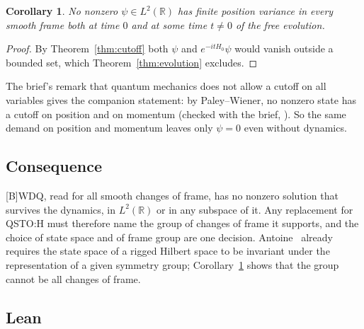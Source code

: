 \documentclass[11pt]{article}
\newtheorem{corollary}[theorem]{Corollary}
\theoremstyle{remark}
\begin{document}
\begin{corollary}\label{cor:frames}
  No nonzero $\psi \in L^2(\mathbb R)$ has finite position variance in every smooth frame both at
  time $0$ and at some time $t \ne 0$ of the free evolution.
\end{corollary}

\begin{proof}
  By Theorem~\ref{thm:cutoff} both $\psi$ and $e^{-itH_0}\psi$ would vanish outside a bounded
  set, which Theorem~\ref{thm:evolution} excludes.
\end{proof}

The brief's remark that quantum mechanics does not allow a cutoff on all variables gives the
companion statement: by Paley--Wiener, no nonzero state has a cutoff on position and on momentum
(checked with the brief, ). So the same demand on
position and momentum leaves only $\psi = 0$ even without dynamics.

\subsection{Consequence}

[B]WDQ, read for all smooth changes of frame, has no nonzero solution that survives the dynamics,
in $L^2(\mathbb R)$ or in any subspace of it. Any replacement for QSTO:H must therefore name the
group of changes of frame it supports, and the choice of state space and of frame group are one
decision. Antoine~\cite[Sec.~II]{antoine} already requires the state space of a rigged Hilbert
space to be invariant under the representation of a given symmetry group; Corollary~\ref{cor:frames}
shows that the group cannot be all changes of frame.

\subsection{Lean}
\end{document}
